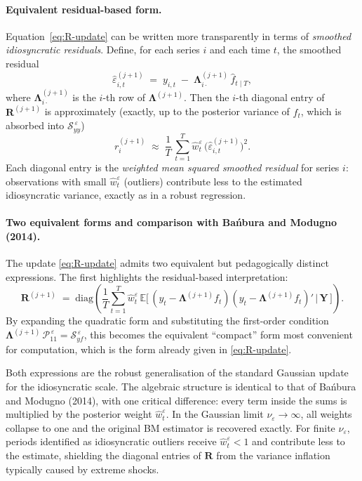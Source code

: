 \documentclass[11pt, a4paper, oneside]{article}
\newcommand{\mY}{\mathbf{Y}}
\newcommand{\mL}{\boldsymbol{\Lambda}}
\newcommand{\mR}{\mathbf{R}}
\begin{document}
\paragraph{Equivalent residual-based form.}
Equation~\eqref{eq:R-update} can be written more transparently in
terms of \emph{smoothed idiosyncratic residuals}. Define, for each
series $i$ and each time $t$, the smoothed residual
\[
\hat{\varepsilon}^{(j+1)}_{i,t} \;=\; y_{i,t} \;-\; \mL^{(j+1)}_{i \cdot}\, \hat{f}_{t \mid T},
\]
where $\mL^{(j+1)}_{i \cdot}$ is the $i$-th row of
$\mL^{(j+1)}$. Then the $i$-th diagonal entry of
$\mR^{(j+1)}$ is approximately (exactly, up to the posterior variance
of $f_t$, which is absorbed into $\mathcal{S}_{yy}^{\,\varepsilon}$)
\[
r^{(j+1)}_i \;\approx\; \frac{1}{T}\, \sum_{t=1}^{T} \hat{w}^\varepsilon_t\, \big(\hat{\varepsilon}^{(j+1)}_{i,t}\big)^2.
\]
Each diagonal entry is the \emph{weighted mean squared smoothed
residual} for series $i$: observations with small $\hat{w}^\varepsilon_t$
(outliers) contribute less to the estimated idiosyncratic variance,
exactly as in a robust regression.

\paragraph{Two equivalent forms and comparison with Bańbura and Modugno (2014).}
The update \eqref{eq:R-update} admits two equivalent but pedagogically
distinct expressions. The first highlights the residual-based
interpretation:
\begin{equation}
\mR^{(j+1)} \;=\; \mathrm{diag}\!\left(\frac{1}{T}\sum_{t=1}^{T} \hat{w}^\varepsilon_t\, \mathbb{E}\!\big[\,(y_t - \mL^{(j+1)} f_t)(y_t - \mL^{(j+1)} f_t)' \,\big|\, \mY\,\big]\right).
\label{eq:R-update-residuals}
\end{equation}
By expanding the quadratic form and substituting the first-order
condition $\mL^{(j+1)}\, \mathcal{P}_{11}^{\,\varepsilon} = \mathcal{S}_{yf}^{\,\varepsilon}$,
this becomes the equivalent ``compact'' form most convenient for
computation, which is the form already given in \eqref{eq:R-update}.

Both expressions are the robust generalisation of the standard
Gaussian update for the idiosyncratic scale. The algebraic structure
is identical to that of Bańbura and Modugno (2014), with one
critical difference: every term inside the sums is multiplied by the
posterior weight $\hat{w}^\varepsilon_t$. In the Gaussian limit
$\nu_\varepsilon \to \infty$, all weights collapse to one and the
original BM estimator is recovered exactly. For finite
$\nu_\varepsilon$, periods identified as idiosyncratic outliers
receive $\hat{w}^\varepsilon_t < 1$ and contribute less to the
estimate, shielding the diagonal entries of $\mR$ from the variance
inflation typically caused by extreme shocks.
\end{document}
